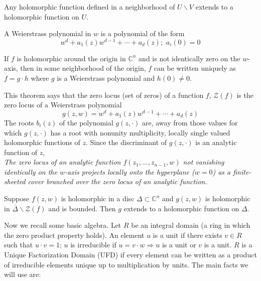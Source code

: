 \begin{thm}

Any holomorphic function defined in a neighborhood of $U \backslash V$ extends to a holomorphic function on $U$.

\end{thm}


\begin{defn}

A Weierstrass polynomial in $w$ is a polynomial of the form
\[
	w^d + a_1(z) w^{d-1} + \cdots + a_d(z); \hspace{4pt} a_i(0)=0
\]


\end{defn}


\begin{thm}

If $f$ is holomorphic around the origin in $ \mathbb{C}^n$ and is not identically zero on the $w$-axis, then in some neighborhood of the origin, $f$ can be written uniquely as $f =g \cdot h$ where $g$ is a Weierstrass polynomial and $h(0) \neq 0$.

\end{thm}

This theorem says that the zero locus (set of zeros) of a function $f$, $ \mathcal{Z}(f)$ is the zero locus of a Weierstrass polynomial 
\[
	g(z,w) = w^d + a_1(z) w^{d-1} + \cdots + a_d(z)
\]
The roots $b_i(z)$ of the polynomial $g(z, \cdot)$ are, away from those values for which $g(z, \cdot)$ has a root with nonunity multiplicity, locally single valued holomorphic functions of $z$. Since the discriminant of $g(z, \cdot)$ is an analytic function of $z$, \\
\indent \textit{The zero locus of an analytic function $f(z_1, \ldots, z_{n-1},w)$ not vanishing identically on the $w$-axis projects locally onto the hyperplane ($w=0$) as a finite-sheeted cover branched over the zero locus of an analytic function.}


\begin{thm}

	Suppose $f(z,w)$ is holomorphic in a disc $\Delta \subset \mathbb{C}^n$ and $g(z,w)$ is holomorphic in $\overline{\Delta} \backslash \mathcal{Z}(f)$ and is bounded. Then $g$ extends to a holomorphic function on $\Delta$.

\end{thm}

Now we recall some basic algebra. Let $R$ be an integral domain (a ring in which the zero product property holds). An element $u$ is a unit if there exists $v \in R$ such that $u \cdot v = 1$; $u$ is irreducible if $ u = v \cdot w \Rightarrow u$ is a unit or $v$ is a unit. $R$ is a Unique Factorization Domain (UFD) if every element can be written as a product of irreducible elements unique up to multiplication by units. The main facts we will use are:

